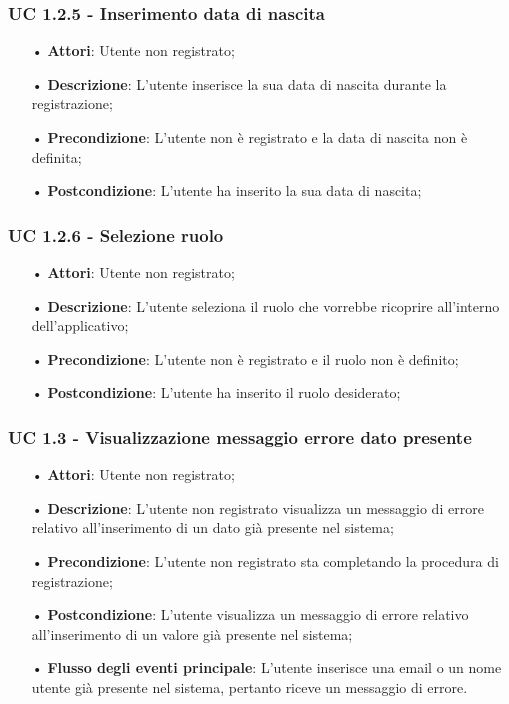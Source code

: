 \subsubsection{UC 1.2.5 - Inserimento data di nascita}
\begin{itemize}
	\item[•]\textbf{Attori}: Utente non registrato;
	\item[•]\textbf{Descrizione}: L'utente inserisce la sua data di nascita durante la registrazione;
	\item[•]\textbf{Precondizione}: L'utente non è registrato e la data di nascita non è definita;
	\item[•]\textbf{Postcondizione}: L'utente ha inserito la sua data di nascita;
\end{itemize}

\subsubsection{UC 1.2.6 - Selezione ruolo}
\begin{itemize}
	\item[•]\textbf{Attori}: Utente non registrato;
	\item[•]\textbf{Descrizione}: L'utente seleziona il ruolo che vorrebbe ricoprire all'interno dell'applicativo;
	\item[•]\textbf{Precondizione}: L'utente non è registrato e il ruolo non è definito;
	\item[•]\textbf{Postcondizione}: L'utente ha inserito il ruolo desiderato;
\end{itemize}

\subsubsection{UC 1.3 - Visualizzazione messaggio errore dato presente}
\begin{itemize}
	\item[•]\textbf{Attori}: Utente non registrato;
	\item[•]\textbf{Descrizione}: L'utente non registrato visualizza un messaggio di errore relativo all'inserimento
	di un dato già presente nel sistema;
	\item[•]\textbf{Precondizione}: L'utente non registrato sta completando la procedura di registrazione;
	\item[•]\textbf{Postcondizione}: L'utente visualizza un messaggio di errore relativo all'inserimento di un valore già presente nel sistema;
	\item[•]\textbf{Flusso degli eventi principale}: L'utente inserisce una email o un nome utente già presente nel sistema, pertanto riceve un messaggio di errore.
\end{itemize}

